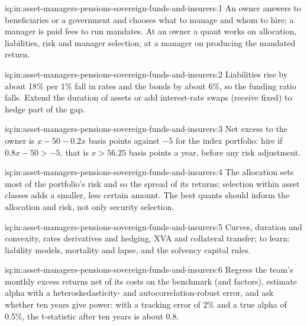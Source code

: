 \begin{solution}{iq:in:asset-managers-pensions-sovereign-funds-and-insurers:1}
An owner answers to beneficiaries or a government and chooses what to manage and whom to hire; a manager is paid fees
to run mandates. At an owner a quant works on allocation, liabilities, risk and manager selection; at a manager on
producing the mandated return.
\end{solution}

\begin{solution}{iq:in:asset-managers-pensions-sovereign-funds-and-insurers:2}
Liabilities rise by about 18\% per 1\% fall in rates and the bonds by about 6\%, so the funding ratio falls. Extend the
duration of assets or add interest-rate swaps (receive fixed) to hedge part of the gap.
\end{solution}

\begin{solution}{iq:in:asset-managers-pensions-sovereign-funds-and-insurers:3}
Net excess to the owner is $x-50-0.2x$ basis points against $-5$ for the index portfolio: hire if $0.8x-50>-5$, that
is $x>56.25$ basis points a year, before any risk adjustment.
\end{solution}

\begin{solution}{iq:in:asset-managers-pensions-sovereign-funds-and-insurers:4}
The allocation sets most of the portfolio's risk and so the spread of its returns; selection within asset classes adds
a smaller, less certain amount. The best quants should inform the allocation and risk, not only security selection.
\end{solution}

\begin{solution}{iq:in:asset-managers-pensions-sovereign-funds-and-insurers:5}
Curves, duration and convexity, rates derivatives and hedging, XVA and collateral transfer; to learn: liability models,
mortality and lapse, and the solvency capital rules.
\end{solution}

\begin{solution}{iq:in:asset-managers-pensions-sovereign-funds-and-insurers:6}
Regress the team's monthly excess returns net of its costs on the benchmark (and factors), estimate alpha with a
heteroskedasticity- and autocorrelation-robust error, and ask whether ten years give power: with a tracking error of
2\% and a true alpha of 0.5\%, the t-statistic after ten years is about 0.8.
\end{solution}
